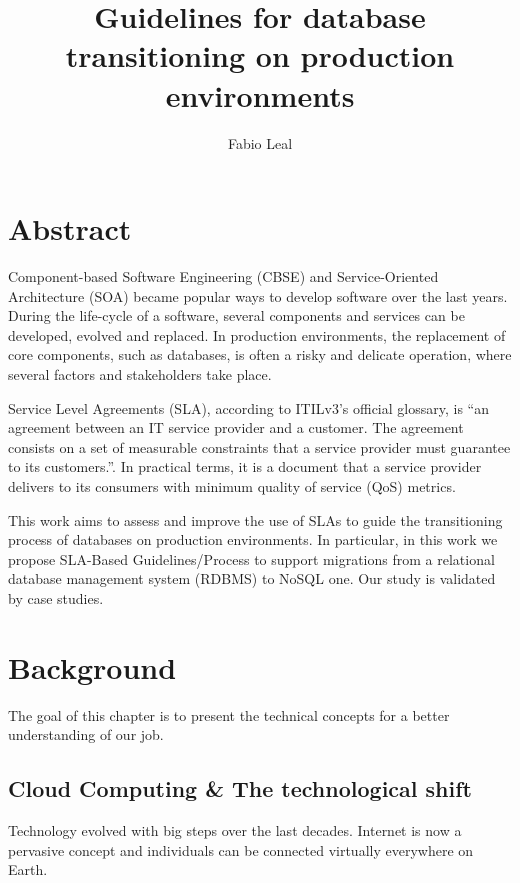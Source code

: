 \documentclass{article}
\begin{document}
\title{Guidelines for database transitioning on production environments}
\author{Fabio Leal}
\maketitle  


\section{Abstract}
Component-based Software Engineering (CBSE) and Service-Oriented Architecture (SOA) became  popular ways to develop software over the last years. During the life-cycle of a software, several components and services can be developed, evolved and replaced. In production environments, the replacement of core components, such as databases, is often a risky and delicate operation, where several factors and stakeholders take place.

Service Level Agreements (SLA), according to ITILv3's official glossary, is ``an agreement between an IT service provider and a customer. The agreement consists on a set of measurable constraints that a service provider must guarantee to its customers.''. In practical terms, it is a document that a service provider delivers to its consumers with minimum quality of service (QoS) metrics.

This work aims to assess and improve the use of SLAs to guide the transitioning process of databases on production environments. In particular, in this work we propose SLA-Based Guidelines/Process to  support migrations from a relational database management system (RDBMS) to NoSQL one. Our study is validated by case studies.


\section{Background}
The goal of this chapter is to present the technical concepts for a better understanding of our job. 

\subsection{Cloud Computing \& The technological shift}

Technology evolved with big steps over the last decades. Internet is now a pervasive concept and individuals can be connected virtually everywhere on Earth. \cite{Armbrust09m.:above}
\end{document}
